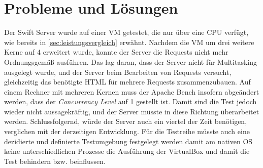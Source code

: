 \section{Probleme und Lösungen}
Der Swift Server wurde auf einer VM getestet, die nur über eine CPU verfügt, wie bereits in \ref{sec:leistungsvergleich} erwähnt. Nachdem die VM um drei weitere Kerne auf 4 erweitert wurde, konnte der Server die Requests nicht mehr Ordnungsgemäß ausführen. Das lag daran, dass der Server nicht für Multitasking ausgelegt wurde, und der Server beim Bearbeiten von Requests versucht, gleichzeitig das benötigte HTML für mehrere Requests zusammenzubauen. Auf einem Rechner mit mehreren Kernen muss der Apache Bench insofern abgeändert werden, dass der \textit{Concurrency Level} auf 1 gestellt ist. Damit sind die Test jedoch wieder nicht aussagekräftig, und der Server müsste in diese Richtung überarbeitet werden. Schlussfolgernd, würde der Server auch ein viertel der Zeit benötigen, verglichen mit der derzeitigen Entwicklung.
Für die Testreihe müsste auch eine dezidierte und definierte Testumgebung festgelegt werden damit am nativen OS keine unterschiedlichen Prozesse die Ausführung der VirtualBox und damit die Test behindern bzw. beinflussen.

\chapterend

